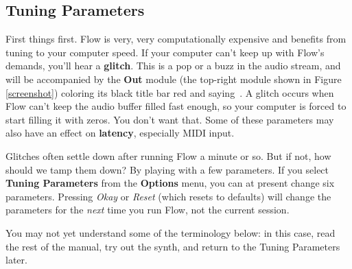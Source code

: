 \documentclass{article}
\newcommand\name{Flow}
\begin{document}
\subsection{Tuning Parameters}
First things first.  {\name} is very, very computationally expensive and benefits from tuning to your computer speed.  If your computer can't keep up with Flow's demands, you'll hear a {\bf glitch}.  This is a pop or a buzz in the audio stream, and will be accompanied by the {\bf Out} module (the top-right module shown in Figure \ref{screenshot}) coloring its black title bar red and saying \,.  A glitch occurs when Flow can't keep the audio buffer filled fast enough, so your computer is forced to start filling it with zeros.  You don't want that.  Some of these parameters may also have an effect on {\bf latency}, especially MIDI input.

Glitches often settle down after running Flow a minute or so.  But if not, how should we tamp them down?  By playing with a few parameters. If you select {\bf Tuning Parameters} from the {\bf Options} menu, you can at present change six parameters.  Pressing {\it Okay} or {\it Reset} (which resets to defaults) will change the parameters for the {\it next} time you run {\name}, not the current session.   

You may not yet understand some of the terminology below: in this case, read the rest of the manual, try out the synth, and return to the Tuning Parameters later.
\end{document}
